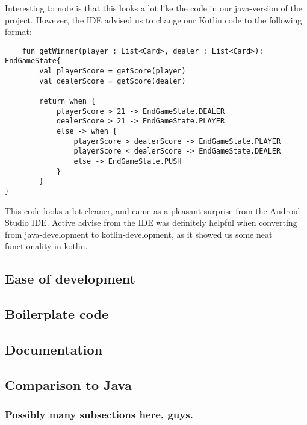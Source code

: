 Interesting to note is that this looks a lot like the code in our java-version of the project. However, the IDE advised us to change our Kotlin code to the following format:
\begin{lstlisting}
    fun getWinner(player : List<Card>, dealer : List<Card>): EndGameState{
        val playerScore = getScore(player)
        val dealerScore = getScore(dealer)
        
        return when {
            playerScore > 21 -> EndGameState.DEALER
            dealerScore > 21 -> EndGameState.PLAYER
            else -> when {
                playerScore > dealerScore -> EndGameState.PLAYER
                playerScore < dealerScore -> EndGameState.DEALER
                else -> EndGameState.PUSH
            }
        }
}
\end{lstlisting}
This code looks a lot cleaner, and came as a pleasant surprise from the Android Studio IDE. Active advise from the IDE was definitely helpful when converting from java-development to kotlin-development, as it showed us some neat functionality in kotlin.
\subsection{Ease of development}

\subsection{Boilerplate code}

\subsection{Documentation}

\subsection{Comparison to Java}
\subsubsection{Possibly many subsections here, guys.}
